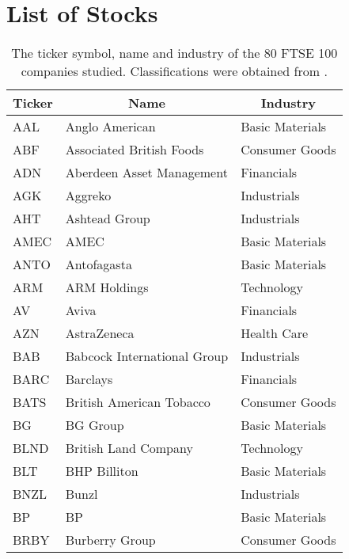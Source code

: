 
\chapter{List of Stocks}

\label{app:listFTSE100Stocks}

\begin{center}
\begin{longtable}{|l|l|l|}
	\caption[List of FTSE 100 Stocks studied]{The ticker symbol, name and industry of the 80 FTSE 100 companies studied. Classifications were obtained from \cite{IcWik,YahFi}.}
	\label{tab:listFTSE100Stocks} \\
	\hline \multicolumn{1}{|c|}{\textbf{Ticker}} & \multicolumn{1}{c|}{\textbf{Name}} & \multicolumn{1}{c|}{\textbf{Industry}} \\ \hline 
	\endfirsthead
	\hline \hline
	\endlastfoot
    AAL   & Anglo American & Basic Materials \\
    ABF   & Associated British Foods & Consumer Goods \\
    ADN   & Aberdeen Asset Management & Financials \\
    AGK   & Aggreko & Industrials \\
    AHT   & Ashtead Group & Industrials \\
    AMEC  & AMEC  & Basic Materials \\
    ANTO  & Antofagasta & Basic Materials \\
    ARM   & ARM Holdings & Technology \\
    AV    & Aviva & Financials \\
    AZN   & AstraZeneca & Health Care \\
    BAB   & Babcock International Group & Industrials \\
    BARC  & Barclays & Financials \\
    BATS  & British American Tobacco & Consumer Goods \\
    BG    & BG Group & Basic Materials \\
    BLND  & British Land Company & Technology \\
    BLT   & BHP Billiton & Basic Materials \\
    BNZL  & Bunzl & Industrials \\
    BP    & BP    & Basic Materials \\
    BRBY  & Burberry Group & Consumer Goods \\

\end{longtable}
\end{center}
